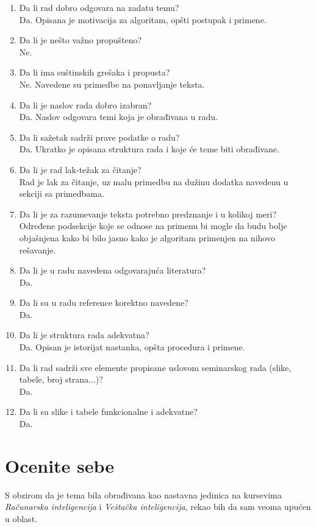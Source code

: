\documentclass[a4paper]{report}
\begin{document}
\begin{enumerate}
\item Da li rad dobro odgovara na zadatu temu?\\
Da. Opisana je motivacija za algoritam, opšti postupak i primene.
\item Da li je nešto važno propušteno?\\
Ne.
\item Da li ima suštinskih grešaka i propusta?\\
Ne. Navedene su primedbe na ponavljanje teksta.
\item Da li je naslov rada dobro izabran?\\
Da. Naslov odgovara temi koja je obrađivana u radu.
\item Da li sažetak sadrži prave podatke o radu?\\
Da. Ukratko je opisana struktura rada i koje će teme biti obrađivane.
\item Da li je rad lak-težak za čitanje?\\
Rad je lak za čitanje, uz malu primedbu na dužinu dodatka navedenu u sekciji sa primedbama.
\item Da li je za razumevanje teksta potrebno predznanje i u kolikoj meri?\\
Određene podsekcije koje se odnose na primenu bi mogle da budu bolje objašnjena kako bi bilo jasno kako je algoritam primenjen na nihovo rešavanje.
\item Da li je u radu navedena odgovarajuća literatura?\\
Da.
\item Da li su u radu reference korektno navedene?\\
Da.
\item Da li je struktura rada adekvatna?\\
Da. Opisan je istorijat nastanka, opšta procedura i primene.
\item Da li rad sadrži sve elemente propisane uslovom seminarskog rada (slike, tabele, broj strana...)?\\
Da.
\item Da li su slike i tabele funkcionalne i adekvatne?\\
Da.
\end{enumerate}

\section{Ocenite sebe}
S obzirom da je tema bila obrađivana kao nastavna jedinica na kursevima \textit{Računarska inteligencija} i \textit{Veštačka inteligencija}, rekao bih da sam veoma upućen u oblast.
\end{document}
